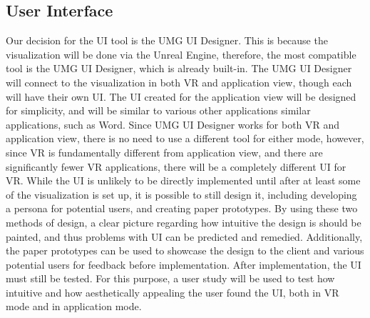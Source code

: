 \documentclass[onecolumn, draftclsnofoot, 10pt, compsoc]{IEEEtran}
\begin{document}
\subsection{User Interface}
\begin{singlespace}
Our decision for the UI tool is the UMG UI Designer. This is because the visualization will be done via the Unreal Engine, therefore, the most compatible tool is the UMG UI Designer, which is already built-in.
\newline
\newline
The UMG UI Designer will connect to the visualization in both VR and application view, though each will have their own UI. The UI created for the application view will be designed for simplicity, and will be similar to various other applications similar applications, such as Word. Since UMG UI Designer works for both VR and application view, there is no need to use a different tool for either mode, however, since VR is fundamentally different from application view, and there are significantly fewer VR applications, there will be a completely different UI for VR.
\newline
\newline
While the UI is unlikely to be directly implemented until after at least some of the visualization is set up, it is possible to still design it, including developing a persona for potential users, and creating paper prototypes. By using these two methods of design, a clear picture regarding how intuitive the design is should be painted, and thus problems with UI can be predicted and remedied. Additionally, the paper prototypes can be used to showcase the design to the client and various potential users for feedback before implementation.
\newline
\newline
After implementation, the UI must still be tested. For this purpose, a user study will be used to test how intuitive and how aesthetically appealing the user found the UI, both in VR mode and in application mode.

\end{singlespace}
\end{document}
